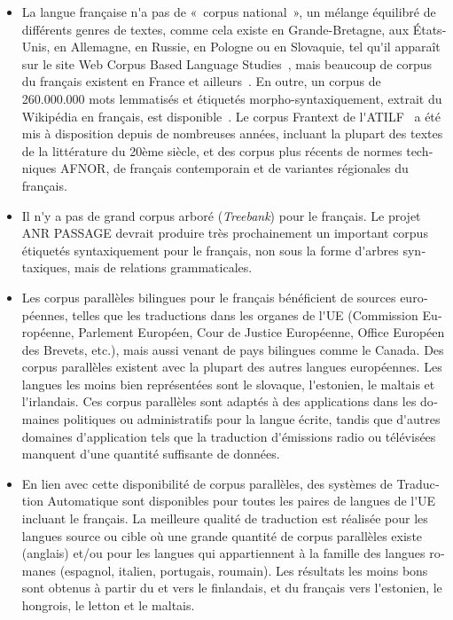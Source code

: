 \begin{french}
\begin{multicols}{2}
\begin{itemize}
\item La langue française n{\mbox '}a pas de «~corpus national~», un mélange équilibré
de différents genres de textes, comme cela existe en Grande-Bretagne,
aux États-Unis, en Allemagne, en Russie, en Pologne ou en Slovaquie,
tel qu{\mbox '}il apparaît sur le site Web Corpus Based Language Studies~\cite{corpuslangstud},
mais beaucoup de corpus du français existent en France et
ailleurs~\cite{corpusfr}. En outre, un corpus de 260.000.000 mots lemmatisés et
étiquetés morpho-syntaxiquement, extrait du Wikipédia en français, est
disponible~\cite{wikipediafr}. Le corpus Frantext de l{\mbox '}ATILF~\cite{atilf} a été mis à disposition
depuis de nombreuses années, incluant la plupart des textes de la
littérature du 20ème siècle, et des corpus plus récents de normes
techniques AFNOR, de français contemporain et de variantes régionales
du français.

\item Il n{\mbox '}y a pas de grand corpus arboré ({\em Treebank}) pour le français. Le projet ANR PASSAGE
devrait produire très prochainement un important corpus étiquetés
syntaxiquement pour le français, non sous la forme d{\mbox '}arbres
syntaxiques, mais de relations grammaticales.

\item Les corpus parallèles bilingues pour le français bénéficient de
sources européennes, telles que les traductions dans les organes de
l{\mbox '}UE (Commission Européenne, Parlement Européen, Cour de Justice
Européenne, Office Européen des Brevets, etc.), mais aussi venant de
pays bilingues comme le Canada. Des corpus parallèles existent avec la
plupart des autres langues européennes. Les langues les moins bien représentées
sont le slovaque, l{\mbox '}estonien, le maltais et l{\mbox '}irlandais. Ces
corpus parallèles sont adaptés à des applications dans les domaines
politiques ou administratifs pour la langue écrite, tandis que
d{\mbox '}autres domaines d{\mbox '}application tels que la traduction d{\mbox '}émissions
radio ou télévisées manquent d{\mbox '}une quantité suffisante de données.

\item En lien avec cette disponibilité de corpus parallèles, des systèmes de
Traduction Automatique sont disponibles pour toutes les paires de
langues de l{\mbox '}UE incluant le français. La meilleure qualité de
traduction est réalisée pour les langues source ou cible où une grande
quantité de corpus parallèles existe (anglais) et/ou pour les langues
qui appartiennent à la famille des langues romanes (espagnol, italien,
portugais, roumain). Les résultats les moins bons sont obtenus à partir du et
vers le finlandais, et du français vers l{\mbox '}estonien, le hongrois, le
letton et le maltais.


\end{itemize}
\end{multicols}
\end{french}
